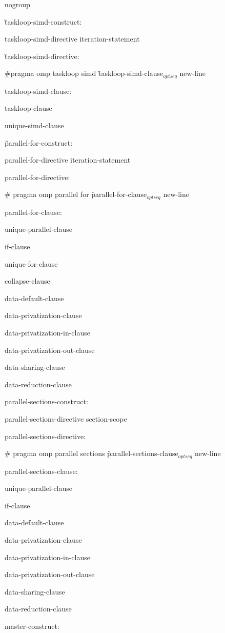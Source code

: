 {\C\I nogroup

\G taskloop-simd-construct:

\I taskloop-simd-directive iteration-statement

\G taskloop-simd-directive:

\C\I \#pragma omp taskloop simd \G taskloop-simd-clause$_{optseq}$ new-line

taskloop-simd-clause:

\I taskloop-clause

\I unique-simd-clause

\G parallel-for-construct:

\I parallel-for-directive iteration-statement

parallel-for-directive:

\C\I \# pragma omp parallel for \G parallel-for-clause$_{optseq}$ new-line

parallel-for-clause:

\I unique-parallel-clause

\I if-clause

\I unique-for-clause

\I collapse-clause

\I data-default-clause 

\I data-privatization-clause 

\I data-privatization-in-clause

\I data-privatization-out-clause 

\I data-sharing-clause 

\I data-reduction-clause 

parallel-sections-construct:

\I parallel-sections-directive section-scope

 parallel-sections-directive:

\C\I \# pragma omp parallel sections \G parallel-sections-clause$_{optseq}$ new-line

parallel-sections-clause:

\I unique-parallel-clause

\I if-clause

\I data-default-clause 

\I data-privatization-clause 

\I data-privatization-in-clause

\I data-privatization-out-clause 

\I data-sharing-clause 

\I data-reduction-clause 

master-construct:

}
